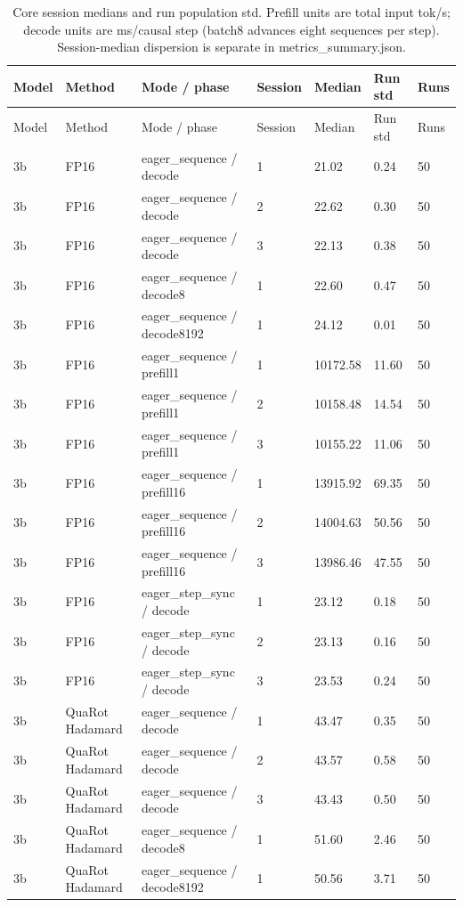 {\small
\begin{longtable}{lllllll}
\caption{Core session medians and run population std. Prefill units are total input tok/s; decode units are ms/causal step (batch8 advances eight sequences per step). Session-median dispersion is separate in metrics\_summary.json.} \\
\toprule
Model & Method & Mode / phase & Session & Median & Run std & Runs \\
\midrule
\endfirsthead
\toprule
Model & Method & Mode / phase & Session & Median & Run std & Runs \\
\midrule
\endhead
3b & FP16 & eager\_sequence / decode & 1 & 21.02 & 0.24 & 50 \\
3b & FP16 & eager\_sequence / decode & 2 & 22.62 & 0.30 & 50 \\
3b & FP16 & eager\_sequence / decode & 3 & 22.13 & 0.38 & 50 \\
3b & FP16 & eager\_sequence / decode8 & 1 & 22.60 & 0.47 & 50 \\
3b & FP16 & eager\_sequence / decode8192 & 1 & 24.12 & 0.01 & 50 \\
3b & FP16 & eager\_sequence / prefill1 & 1 & 10172.58 & 11.60 & 50 \\
3b & FP16 & eager\_sequence / prefill1 & 2 & 10158.48 & 14.54 & 50 \\
3b & FP16 & eager\_sequence / prefill1 & 3 & 10155.22 & 11.06 & 50 \\
3b & FP16 & eager\_sequence / prefill16 & 1 & 13915.92 & 69.35 & 50 \\
3b & FP16 & eager\_sequence / prefill16 & 2 & 14004.63 & 50.56 & 50 \\
3b & FP16 & eager\_sequence / prefill16 & 3 & 13986.46 & 47.55 & 50 \\
3b & FP16 & eager\_step\_sync / decode & 1 & 23.12 & 0.18 & 50 \\
3b & FP16 & eager\_step\_sync / decode & 2 & 23.13 & 0.16 & 50 \\
3b & FP16 & eager\_step\_sync / decode & 3 & 23.53 & 0.24 & 50 \\
3b & QuaRot Hadamard & eager\_sequence / decode & 1 & 43.47 & 0.35 & 50 \\
3b & QuaRot Hadamard & eager\_sequence / decode & 2 & 43.57 & 0.58 & 50 \\
3b & QuaRot Hadamard & eager\_sequence / decode & 3 & 43.43 & 0.50 & 50 \\
3b & QuaRot Hadamard & eager\_sequence / decode8 & 1 & 51.60 & 2.46 & 50 \\
3b & QuaRot Hadamard & eager\_sequence / decode8192 & 1 & 50.56 & 3.71 & 50 \\

\end{longtable}}
